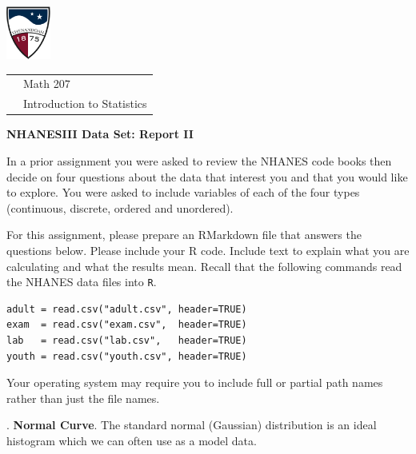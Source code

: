 \documentclass[10pt]{article}
\newcounter{EX}\setcounter{EX}{1}
\newcommand{\EXERCISE}{\arabic{EX}.\stepcounter{EX} }
\begin{document}
\pagestyle{empty}
\lstset{language=R, showspaces=false, showstringspaces=false}

\href{http://www.su.edu}{\includegraphics[height=1.75cm]{sulogo.eps}}
\vspace{-1.69cm}

{\small \hfill
\begin{tabular}{cl}
& Math 207\\& Introduction to Statistics\\
\end{tabular}
}
\setlength{\baselineskip}{1.05\baselineskip}
\medskip
\medskip

\begin{center}
\textbf{\large   NHANESIII Data Set:  Report II}
\end{center}

\newcommand{\SUBX}{\smallskip\hspace{10pt}}
\newcommand{\BSK}{\vspace{.14in}}

In a prior assignment you were asked to
 review the NHANES code books then decide on four questions about the data that interest 
you and that you would like to explore.  
You were asked to include variables of each of the four 
types (continuous, discrete, ordered and unordered). 

For this assignment, please prepare an RMarkdown file that answers the questions below.
Please include your R code.  Include text to explain what you are calculating and
what the results mean.  Recall that the following commands read the NHANES data files
into \texttt{R}.
\vspace{-6pt}
\begin{verbatim}
adult = read.csv("adult.csv", header=TRUE)
exam  = read.csv("exam.csv",  header=TRUE)
lab   = read.csv("lab.csv",   header=TRUE)
youth = read.csv("youth.csv", header=TRUE)
\end{verbatim}\vspace{-6pt}
Your operating system may require you to include full or partial path names rather
than just the file names.
\medskip

\EXERCISE \textbf{Normal Curve}. The standard normal (Gaussian) distribution is an ideal histogram which we can often use
as a model data.
\end{document}
